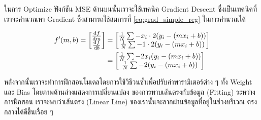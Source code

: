 ในการ Optimize ฟังก์ชัน MSE ด้านบนนั้นเราจะใช้เทคนิค Gradient Descent ซึ่งเป็นเทคนิคที่เราจะคำนวณหา Gradient ซึ่งสามารถใช้สมการที่
\ref{eq:grad_simple_reg} ในการคำนวณได้

\begin{align}\label{eq:grad_simple_reg}
    f'(m,b) =
      \begin{bmatrix}
        \dv{f}{m}\\
        \dv{f}{b}\\
      \end{bmatrix}
    &=
      \begin{bmatrix}
        \frac{1}{N} \sum -x_i \cdot 2(y_i - (mx_i + b)) \\
        \frac{1}{N} \sum -1 \cdot 2(y_i - (mx_i + b)) \\
      \end{bmatrix}\\
    &=
      \begin{bmatrix}
         \frac{1}{N} \sum -2x_i(y_i - (mx_i + b)) \\
         \frac{1}{N} \sum -2(y_i - (mx_i + b)) \\
      \end{bmatrix}
\end{align}

หลังจากนั้นเราจะทำการฝึกสอนโมเดลโดยการใช้วิธีวนซ้ำเพื่อปรับค่าพารามิเตอร์ต่าง ๆ ทั้ง Weight และ Bias โดยภาพด้านล่างแสดงการเปลี่ยนแปลง%
ของการทาบเส้นตรงกับข้อมูล (Fitting) ระหว่างการฝึกสอน เราจะพบว่าเส้นตรง (Linear Line) ของเรานั้นจะลากผ่านข้อมูลที่อยู่ในช่วงบริเวณ%
ตรงกลางได้ดีขึ้นเรื่อย ๆ 

